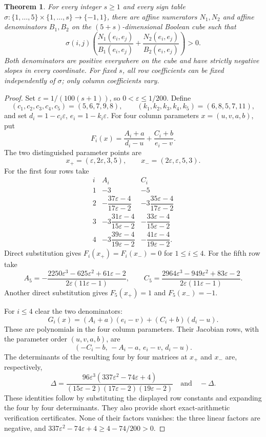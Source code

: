 \documentclass[11pt]{article}
\newtheorem{theorem}{Theorem}
\begin{document}
\begin{theorem}
For every integer $s\geq1$ and every sign table
$\sigma:\{1,\ldots,5\}\times\{1,\ldots,s\}\to\{-1,1\}$, there
are affine numerators $N_1,N_2$ and affine denominators $B_1,B_2$
on the $(5+s)$-dimensional Boolean cube such that
\[
 \sigma(i,j)\left(\frac{N_1(e_i,e_j)}{B_1(e_i,e_j)}
                 +\frac{N_2(e_i,e_j)}{B_2(e_i,e_j)}\right)>0.
\]
Both denominators are positive everywhere on the cube and have strictly
negative slopes in every coordinate. For fixed $s$, all row coefficients
can be fixed independently of $\sigma$; only column coefficients vary.
\end{theorem}
\begin{proof}
Set $\varepsilon=1/(100(s+1))$, so $0<\varepsilon\leq1/200$. Define
\[
 (c_1,c_2,c_3,c_4,c_5)=(5,6,7,9,8),\qquad
 (k_1,k_2,k_3,k_4,k_5)=(6,8,5,7,11),
\]
and set $d_i=1-c_i\varepsilon$, $e_i=1-k_i\varepsilon$. For four
column parameters $x=(u,v,a,b)$, put
\[
 F_i(x)=\frac{A_i+a}{d_i-u}+\frac{C_i+b}{e_i-v}.
\]
The two distinguished parameter points are
\[
 x_+=(\varepsilon,2\varepsilon,3,5),\qquad
 x_-=(2\varepsilon,\varepsilon,5,3).
\]
For the first four rows take
\[
\begin{array}{c|cc}
 i&A_i&C_i\\\hline
 1&-3&-5\\
 2&-\dfrac{37\varepsilon-4}{17\varepsilon-2}
  &-3\dfrac{35\varepsilon-4}{17\varepsilon-2}\\
 3&-3\dfrac{31\varepsilon-4}{15\varepsilon-2}
  &-\dfrac{33\varepsilon-4}{15\varepsilon-2}\\
 4&-3\dfrac{39\varepsilon-4}{19\varepsilon-2}
  &-\dfrac{41\varepsilon-4}{19\varepsilon-2}.
\end{array}
\]
Direct substitution gives $F_i(x_+)=F_i(x_-)=0$ for $1\leq i\leq4$.
For the fifth row take
\[
 A_5=-\frac{2250\varepsilon^3-625\varepsilon^2+61\varepsilon-2}
                   {2\varepsilon(11\varepsilon-1)},\qquad
 C_5=\frac{2964\varepsilon^3-949\varepsilon^2+83\varepsilon-2}
                   {2\varepsilon(11\varepsilon-1)}.
\]
Another direct substitution gives $F_5(x_+)=1$ and $F_5(x_-)=-1$.

For $i\leq4$ clear the two denominators:
\[
 G_i(x)=(A_i+a)(e_i-v)+(C_i+b)(d_i-u).
\]
These are polynomials in the four column parameters. Their Jacobian
rows, with the parameter order $(u,v,a,b)$, are
\[
 (-C_i-b,\,-A_i-a,\,e_i-v,\,d_i-u).
\]
The determinants of the resulting four by four matrices at $x_+$ and
$x_-$ are, respectively,
\[
 \Delta=\frac{96\varepsilon^3
                 (337\varepsilon^2-74\varepsilon+4)}
              {(15\varepsilon-2)(17\varepsilon-2)(19\varepsilon-2)}
 \quad\text{and}\quad-\Delta.
\]
These identities follow by substituting the displayed row constants
and expanding the four by four determinants. They also provide short
exact-arithmetic verification certificates. None of their factors
vanishes: the three linear factors are negative, and
$337\varepsilon^2-74\varepsilon+4\geq4-74/200>0$.


\end{proof}
\end{document}
